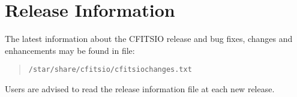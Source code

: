 \documentclass[twoside,11pt]{article}
\newcommand{\xlabel}[1]{}
\renewcommand{\_}{\texttt{\symbol{95}}}
\begin{document}
\section{\xlabel{release_information}Release Information}
\label{release_information}

The latest information about the CFITSIO release and bug fixes, changes 
and enhancements may be found in file:

\begin{quote}
\texttt{/star/share/cfitsio/cfitsio\_changes.txt}
\end{quote}

Users are advised to read the release information file at each new
release.

\end{document}

